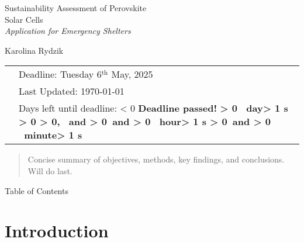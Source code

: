 \documentclass{article}
\newcounter{deadlineyear}\setcounter{deadlineyear}{2025}
\newcounter{deadlinemonth}\setcounter{deadlinemonth}{5} %
\newcounter{deadlineday}\setcounter{deadlineday}{6}
\newcounter{deadlinetime}\setcounter{deadlinetime}{0} %
\newcounter{mydatenumber}
\newcounter{currentdate}
\newcounter{daysdiff}
\newcounter{currenttime}
\newcounter{totalminutes}
\newcounter{displaydays}
\newcounter{remainingmins}
\newcounter{displayhours}
\newcounter{displaymins}
\newcommand{\timeUntilDeadline}{%
	\setmydatenumber{mydatenumber}{\thedeadlineyear}{\thedeadlinemonth}{\thedeadlineday}%
	\setmydatenumber{currentdate}{\the\year}{\the\month}{\the\day}%
	\setcounter{daysdiff}{\themydatenumber - \thecurrentdate}%
	\setcounter{currenttime}{\time}%
	\setcounter{totalminutes}{\thedaysdiff * 1440 + \thedeadlinetime - \thecurrenttime}%
	\ifnum\thetotalminutes < 0
	\textbf{\color{red}Deadline passed!}%
	\else
	\setcounter{displaydays}{\thetotalminutes / 1440}%
	\setcounter{remainingmins}{\thetotalminutes - \thedisplaydays * 1440}%
	\setcounter{displayhours}{\theremainingmins / 60}%
	\setcounter{displaymins}{\theremainingmins - \thedisplayhours * 60}%
	\textbf{%
		\ifnum\thedisplaydays > 0
		\thedisplaydays\ day\ifnum\thedisplaydays > 1 s\fi%
		\ifnum\thedisplayhours > 0
		\ifnum\thedisplaymins > 0, \else\ and \fi%
		\else
		\ifnum\thedisplaymins > 0\ and \fi%
		\fi%
		\fi%
		\ifnum\thedisplayhours > 0
		\thedisplayhours\ hour\ifnum\thedisplayhours > 1 s\fi%
		\ifnum\thedisplaymins > 0\ and \fi%
		\fi%
		\ifnum\thedisplaymins > 0
		\thedisplaymins\ minute\ifnum\thedisplaymins > 1 s\fi%
		\fi%
	}%
	\fi
}
\begin{document}
\thispagestyle{empty}
\vspace*{10em}

\Huge \noindent 
Sustainability Assessment of \color{green!50!black}Perovskite\\ Solar Cells \\[1em]
\color{black}
\normalsize \textit{Application for Emergency Shelters}\\
\vspace*{4em}

\noindent \large Karolina Rydzik

\vspace*{\fill}

\normalsize
\hspace*{-2.9em}
\begin{tabular}{@{}l l@{}}
	& Deadline: Tuesday 6$^{\text{th}}$ May, 2025\\
	& Last Updated: \today\, \currenttime \\
	& Days left until deadline: \timeUntilDeadline \\
\end{tabular}

	\newpage\thispagestyle{empty}
	
	\begin{abstract} 
		Concise summary of objectives, methods, key findings, and conclusions. Will do last.
	\end{abstract}
	
	\newpage{}
	
	\noindent
	
	\huge Table of Contents\\
	
	\normalsize
	
	{
		\hypersetup{linkcolor=black}
		\tableofcontents
	}    


	\thispagestyle{empty}

	{
		\hypersetup{linkcolor=black}
		\tableofcontents
	}    
	
	
	\newpage{}
	\noindent{}\setcounter{page}{1}


\section{Introduction}
\end{document}
